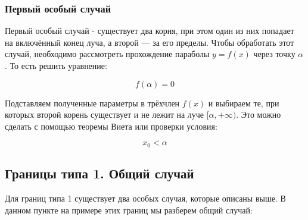 \subsubsection {Первый особый случай}

Первый особый случай - существует два корня, при этом один из них попадает на включённый конец
луча, а второй --- за его пределы. Чтобы обработать этот случай, необходимо рассмотреть прохождение
параболы $y = f(x)$ через точку $\alpha$. То есть решить уравнение:

\begin {equation*}
    f(\alpha) = 0
\end {equation*}

Подставляем полученные параметры в трёхчлен $f(x)$ и выбираем те, при которых второй корень
существует и не лежит на луче $[\alpha, +\infty)$. Это можно сделать с помощью теоремы Виета или
проверки условия:

\begin {equation*}
    x_0 < \alpha
\end {equation*}

\subsection {Границы типа 1. Общий случай}

Для границ типа 1 существует два особых случая, которые описаны выше. В данном пункте на примере
этих границ мы разберем общий случай:

